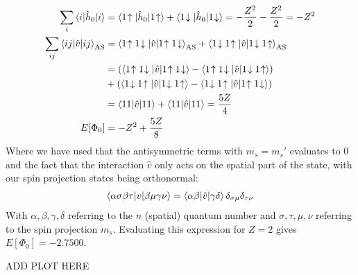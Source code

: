\documentclass{article}
\newcommand{\upst}[1]{#1\hspace{-2px}\uparrow}
\newcommand{\downst}[1]{#1\hspace{-2px}\downarrow}
\newcommand{\inner}[3]{\braket{#1|#2|#3}}
\newcommand{\innerAS}[3]{\inner{#1}{#2}{#3}_{\text{AS}}}
\newcommand{\hnull}{\hat{h}_0}
\begin{document}
    \begin{align*}
        \sum_{i} \inner{i}{\hnull}{i} &= \inner{\upst{1}}{\hnull}{\upst{1}} + \inner{\downst{1}}{\hnull}{\downst{1}} = -\frac{Z^2}{2} -\frac{Z^2}{2} = -Z^2 \\
        \sum_{ij} \innerAS{ij}{\hat{v}}{ij}  &=\innerAS{\upst{1}\downst{1}}{\hat{v}}{\upst{1}\downst{1}} + \innerAS{\downst{1}\upst{1}}{\hat{v}}{\downst{1}\upst{1}} \\
        &=  (\inner{\upst{1}\downst{1}}{\hat{v}}{\upst{1}\downst{1}} - \inner{\upst{1}\downst{1}}{\hat{v}}{\downst{1}\upst{1}}) \\
        &+(\inner{\downst{1}\upst{1}}{\hat{v}}{\downst{1}\upst{1}} - \inner{\downst{1}\upst{1}}{\hat{v}}{\upst{1}\downst{1}}) \\
        &= \inner{11}{\hat{v}}{11} + \inner{11}{\hat{v}}{11} = \frac{5Z}{4} \\
        E[\Phi_0] &= -Z^2 + \frac{5Z}{8}
    \end{align*}
    Where we have used that the antisymmetric terms with $m_s = m_s'$ evaluates to 0 and the fact that the interaction $\hat{v}$ only acts on the spatial part of the state, with our spin projection states being orthonormal:
    \begin{align*}
        \inner{\alpha\sigma\beta\tau}{v}{\beta\mu\gamma\nu} = \inner{\alpha \beta}{\hat{v}}{\gamma \delta} \delta_{\sigma\mu}\delta_{\tau\nu}
    \end{align*}
    With $\alpha, \beta, \gamma, \delta$ referring to the $n$ (spatial) quantum number and $\sigma, \tau, \mu, \nu$ referring to the spin projection $m_s$. Evaluating this expression for $Z=2$ gives $E[\Phi_0] = -2.7500$. 

    ADD PLOT HERE
\end{document}
